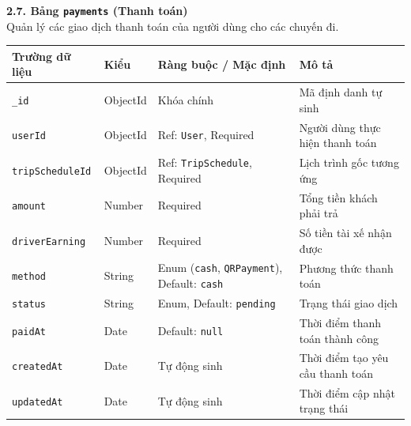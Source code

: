\documentclass[../DoAn.tex]{subfiles}
\begin{document}
\textbf{2.7. Bảng \texttt{payments} (Thanh toán)} \\
Quản lý các giao dịch thanh toán của người dùng cho các chuyến đi.
\begin{table}[H]
    \centering
    \begin{tabular}{|l|l|p{4cm}|p{5cm}|}
        \hline
        \textbf{Trường dữ liệu} & \textbf{Kiểu} & \textbf{Ràng buộc / Mặc định}                                    & \textbf{Mô tả}                   \\ \hline
        \texttt{\_id}           & ObjectId      & Khóa chính                                                       & Mã định danh tự sinh             \\ \hline
        \texttt{userId}         & ObjectId      & Ref: \texttt{User}, Required                                     & Người dùng thực hiện thanh toán  \\ \hline
        \texttt{tripScheduleId} & ObjectId      & Ref: \texttt{TripSchedule}, Required                             & Lịch trình gốc tương ứng         \\ \hline
        \texttt{amount}         & Number        & Required                                                         & Tổng tiền khách phải trả         \\ \hline
        \texttt{driverEarning}  & Number        & Required                                                         & Số tiền tài xế nhận được         \\ \hline
        \texttt{method}         & String        & Enum (\texttt{cash}, \texttt{QRPayment}), Default: \texttt{cash} & Phương thức thanh toán           \\ \hline
        \texttt{status}         & String        & Enum, Default: \texttt{pending}                                  & Trạng thái giao dịch             \\ \hline
        \texttt{paidAt}         & Date          & Default: \texttt{null}                                           & Thời điểm thanh toán thành công  \\ \hline
        \texttt{createdAt}      & Date          & Tự động sinh                                                     & Thời điểm tạo yêu cầu thanh toán \\ \hline
        \texttt{updatedAt}      & Date          & Tự động sinh                                                     & Thời điểm cập nhật trạng thái    \\ \hline
    \end{tabular}
\end{table}
\end{document}
